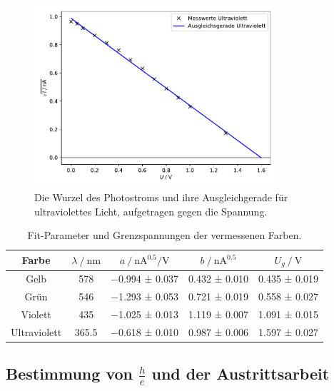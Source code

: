 \begin{figure}[H]
    \centering
    \includegraphics[width=0.8\textwidth]{build/plot_sqrt_ultraviolett.pdf}
    \caption{Die Wurzel des Photostroms und ihre Ausgleichgerade für ultraviolettes Licht, aufgetragen gegen die Spannung.}
    \label{fig:plot_sqrt_ultraviolett}
\end{figure}

\begin{table}
  \centering
  \caption{Fit-Parameter und Grenzspannungen der vermessenen Farben.}
  \label{tab:grenzspannungen}
  \begin{tabular}{c S c c c}
  \toprule
  Farbe &
  $\lambda \mathbin{/} \si{\nano\meter}$ &
  $a \mathbin{/} \si{\nano\ampere\tothe{0.5}\per\volt}$ &
  $b \mathbin{/} \si{\nano\ampere\tothe{0.5}}$ &
  $U_g \mathbin{/} \si{\volt}$ \\
  \midrule
  Gelb         & 578   & \num{-0.994} ± \num{0.037} & \num{0.432} ± \num{0.010} & \num{0.435} ± \num{0.019} \\
  Grün         & 546   & \num{-1.293} ± \num{0.053} & \num{0.721} ± \num{0.019} & \num{0.558} ± \num{0.027} \\
  Violett      & 435   & \num{-1.025} ± \num{0.013} & \num{1.119} ± \num{0.007} & \num{1.091} ± \num{0.015} \\
  Ultraviolett & 365.5 & \num{-0.618} ± \num{0.010} & \num{0.987} ± \num{0.006} & \num{1.597} ± \num{0.027} \\
  \bottomrule
  \end{tabular}
\end{table}

\subsection{Bestimmung von \texorpdfstring{$\frac{h}{e}$}{h/e} und der Austrittsarbeit}
\label{sec:auswertung:gelb_full}

